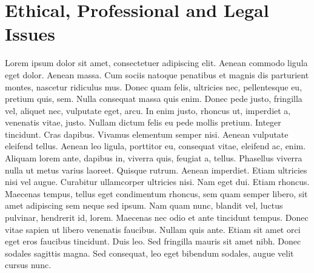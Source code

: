 \section{Ethical, Professional and Legal Issues}

Lorem ipsum dolor sit amet, consectetuer adipiscing elit. Aenean commodo ligula eget dolor. Aenean massa. Cum sociis natoque penatibus et magnis dis parturient montes, nascetur ridiculus mus. Donec quam felis, ultricies nec, pellentesque eu, pretium quis, sem. Nulla consequat massa quis enim. Donec pede justo, fringilla vel, aliquet nec, vulputate eget, arcu. In enim justo, rhoncus ut, imperdiet a, venenatis vitae, justo. Nullam dictum felis eu pede mollis pretium. Integer tincidunt. Cras dapibus. Vivamus elementum semper nisi. Aenean vulputate eleifend tellus. Aenean leo ligula, porttitor eu, consequat vitae, eleifend ac, enim. Aliquam lorem ante, dapibus in, viverra quis, feugiat a, tellus. Phasellus viverra nulla ut metus varius laoreet. Quisque rutrum. Aenean imperdiet. Etiam ultricies nisi vel augue. Curabitur ullamcorper ultricies nisi. Nam eget dui. Etiam rhoncus. Maecenas tempus, tellus eget condimentum rhoncus, sem quam semper libero, sit amet adipiscing sem neque sed ipsum. Nam quam nunc, blandit vel, luctus pulvinar, hendrerit id, lorem. Maecenas nec odio et ante tincidunt tempus. Donec vitae sapien ut libero venenatis faucibus. Nullam quis ante. Etiam sit amet orci eget eros faucibus tincidunt. Duis leo. Sed fringilla mauris sit amet nibh. Donec sodales sagittis magna. Sed consequat, leo eget bibendum sodales, augue velit cursus nunc.
